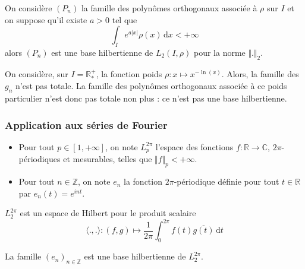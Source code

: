 
	\begin{application}
		On considère $(P_n)$ la famille des polynômes orthogonaux associée à $\rho$ sur $I$ et on suppose qu'il existe $a > 0$ tel que
		\[ \int_I e^{a \vert x \vert} \rho(x) \, \mathrm{d}x < +\infty \]
		alors $(P_n)$ est une base hilbertienne de $L_2(I, \rho)$ pour la norme $\Vert . \Vert_2$.
	\end{application}

	\begin{cexample}
		On considère, sur $I = \mathbb{R}^+_*$, la fonction poids $\rho : x \mapsto x^{-\ln(x)}$. Alors, la famille des $g_n$ n'est pas totale. La famille des polynômes orthogonaux associée à ce poids particulier n'est donc pas totale non plus : ce n'est pas une base hilbertienne.
	\end{cexample}

	\subsubsection{Application aux séries de Fourier}


	\begin{notation}
		\begin{itemize}
			\item Pour tout $p \in [1, +\infty]$, on note $L_p^{2\pi}$ l'espace des fonctions $f : \mathbb{R} \rightarrow \mathbb{C}$, $2\pi$-périodiques et mesurables, telles que $\Vert f \Vert_p < +\infty$.
			\item Pour tout $n \in \mathbb{Z}$, on note $e_n$ la fonction $2\pi$-périodique définie pour tout $t \in \mathbb{R}$ par $e_n(t) = e^{int}$.
		\end{itemize}
	\end{notation}

	\begin{proposition}
		$L_2^{2\pi}$ est un espace de Hilbert pour le produit scalaire
		\[ \langle ., . \rangle : (f, g) \mapsto \frac{1}{2 \pi} \int_0^{2\pi} f(t) \overline{g(t)} \, \mathrm{d}t \]
	\end{proposition}


	\begin{theorem}
		La famille $(e_n)_{n \in \mathbb{Z}}$ est une base hilbertienne de $L_2^{2 \pi}$.
	\end{theorem}

